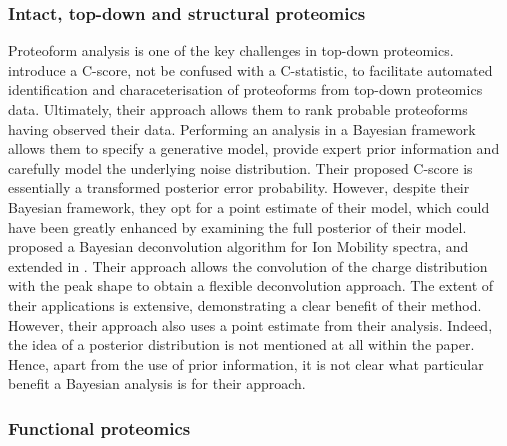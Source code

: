 \documentclass[12pt,english]{article}
\begin{document}
\subsubsection{Intact, top-down and structural proteomics}
Proteoform analysis is one of the key challenges in top-down proteomics. \citet{Leduc::2014} introduce a C-score, not be confused with a C-statistic, to facilitate automated identification and characeterisation of proteoforms from top-down proteomics data. Ultimately, their approach allows them to rank probable proteoforms having observed their data. Performing an analysis in a Bayesian framework allows them to specify a generative model, provide expert prior information and carefully model the underlying noise distribution. Their proposed C-score is essentially a transformed posterior error probability. However, despite their Bayesian framework, they opt for a point estimate of their model, which could have been greatly enhanced by examining the full posterior of their model. \citet{Marty::2015} proposed a Bayesian deconvolution algorithm for Ion Mobility spectra, and extended in \citet{Kostelic::2021}. Their approach allows the convolution of the charge distribution with the peak shape to obtain a flexible deconvolution approach. The extent of their applications is extensive, demonstrating a clear benefit of their method. However, their approach also uses a point estimate from their analysis. Indeed, the idea of a posterior distribution is not mentioned at all within the paper. Hence, apart from the use of prior information, it is not clear what particular benefit a Bayesian analysis is for their approach.

\subsubsection{Functional proteomics}       
	
	

	
\end{document}
